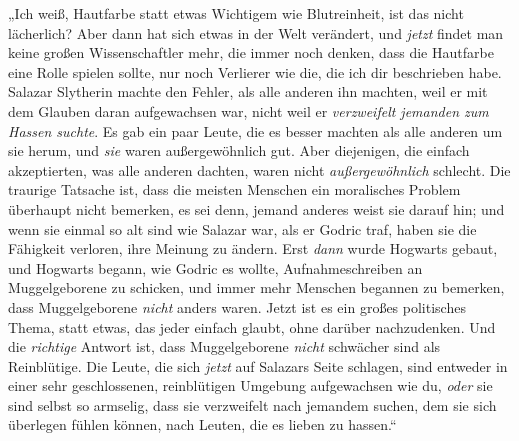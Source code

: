 „Ich weiß, Hautfarbe statt etwas Wichtigem wie Blutreinheit, ist das nicht lächerlich? Aber dann hat sich etwas in der Welt verändert, und \emph{jetzt} findet man keine großen Wissenschaftler mehr, die immer noch denken, dass die Hautfarbe eine Rolle spielen sollte, nur noch Verlierer wie die, die ich dir beschrieben habe. Salazar Slytherin machte den Fehler, als alle anderen ihn machten, weil er mit dem Glauben daran aufgewachsen war, nicht weil er \emph{verzweifelt jemanden zum Hassen suchte}. Es gab ein paar Leute, die es besser machten als alle anderen um sie herum, und \emph{sie} waren außergewöhnlich gut. Aber diejenigen, die einfach akzeptierten, was alle anderen dachten, waren nicht \emph{außergewöhnlich} schlecht. Die traurige Tatsache ist, dass die meisten Menschen ein moralisches Problem überhaupt nicht bemerken, es sei denn, jemand anderes weist sie darauf hin; und wenn sie einmal so alt sind wie Salazar war, als er Godric traf, haben sie die Fähigkeit verloren, ihre Meinung zu ändern. Erst \emph{dann} wurde Hogwarts gebaut, und Hogwarts begann, wie Godric es wollte, Aufnahmeschreiben an Muggelgeborene zu schicken, und immer mehr Menschen begannen zu bemerken, dass Muggelgeborene \emph{nicht} anders waren. Jetzt ist es ein großes politisches Thema, statt etwas, das jeder einfach glaubt, ohne darüber nachzudenken. Und die \emph{richtige} Antwort ist, dass Muggelgeborene \emph{nicht} schwächer sind als Reinblütige. Die Leute, die sich \emph{jetzt} auf Salazars Seite schlagen, sind entweder in einer sehr geschlossenen, reinblütigen Umgebung aufgewachsen wie du, \emph{oder} sie sind selbst so armselig, dass sie verzweifelt nach jemandem suchen, dem sie sich überlegen fühlen können, nach Leuten, die es lieben zu hassen.“

